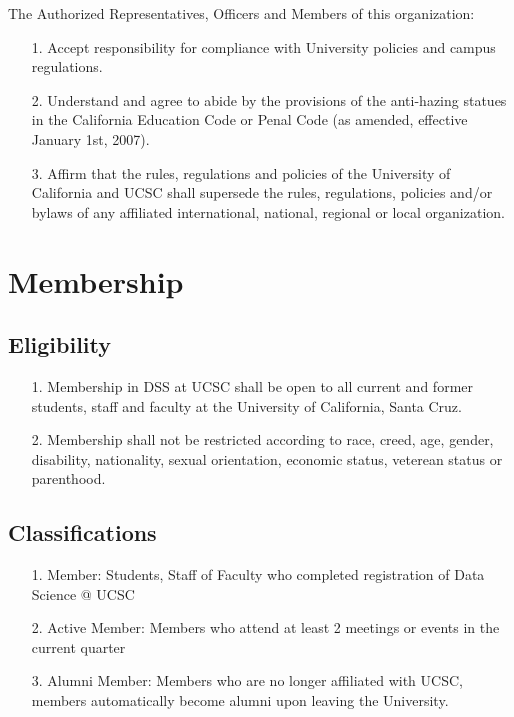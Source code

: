 \documentclass{article}
\begin{document}
The Authorized Representatives, Officers and Members of this organization:
\begin{itemize}
    \item[1.] Accept responsibility for compliance with University policies and campus regulations.
    \item[2.] Understand and agree to abide by the provisions of the anti-hazing statues in the California Education Code or Penal Code (as amended, effective January 1st, 2007).
    \item[3.] Affirm that the rules, regulations and policies of the University of California and UCSC shall supersede the rules, regulations, policies and/or bylaws of any affiliated international, national, regional or local organization. 
\end{itemize}


\section{Membership}

\subsection{Eligibility}
\begin{itemize}
    \item[1.] Membership in DSS at UCSC shall be open to all current and former students, staff 
    and faculty at the University of California, Santa Cruz.
    \item[2.] Membership shall not be restricted according to race, creed, age, gender, 
    disability, nationality, sexual orientation, economic status, veterean status or parenthood.
\end{itemize} 


\subsection{Classifications}
\begin{itemize}
    \item[1.] Member: Students, Staff of Faculty who completed registration of Data Science @ UCSC
    \item[2.] Active Member: Members who attend at least 2 meetings or events in the current quarter
    \item[3.] Alumni Member: Members who are no longer affiliated with UCSC, members automatically become alumni upon leaving the University. 
\end{itemize}
\end{document}
